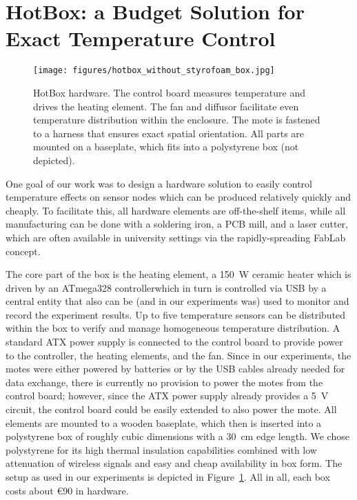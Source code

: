 \documentclass[color]{aib}
\begin{document}
\section{HotBox: a Budget Solution for Exact Temperature Control}

\begin{figure}[t]
\centering
\texttt{[image: figures/hotbox\_without\_styrofoam\_box.jpg]}
\caption{HotBox hardware. The control board measures temperature and drives the heating element. The fan and diffusor facilitate even temperature distribution within the enclosure. The mote is fastened to a harness that ensures exact spatial orientation. All parts are mounted on a baseplate, which fits into a polystyrene box (not depicted).}
\label{fig:hotbox}
\end{figure}

One goal of our work was to design a hardware solution to easily control temperature effects on sensor nodes which can be produced relatively quickly and cheaply.
To facilitate this, all hardware elements are off-the-shelf items, while all manufacturing can be done with a soldering iron, a PCB mill, and a laser cutter, which are often available in university settings via the rapidly-spreading FabLab concept.

The core part of the box is the heating element, a \SI{150}{W} ceramic heater which is driven by an ATmega328 controllerwhich in turn is controlled via USB by a central entity that also can be (and in our experiments was) used to monitor and record the experiment results.
Up to five temperature sensors can be distributed within the box to verify and manage homogeneous temperature distribution.
A standard ATX power supply is connected to the control board to provide power to the controller, the heating elements, and the fan.
Since in our experiments, the motes were either powered by batteries or by the USB cables already needed for data exchange, there is currently no provision to power the motes from the control board; however, since the ATX power supply already provides a \SI{5}{V} circuit, the control board could be easily extended to also power the mote.
All elements are mounted to a wooden baseplate, which then is inserted into a polystyrene box of roughly cubic dimensions with a \SI{30}{cm} edge length.
We chose polystyrene for its high thermal insulation capabilities combined with low attenuation of wireless signals\cite{ryan02master} and easy and cheap availability in box form.
The setup as used in our experiments is depicted in Figure~\ref{fig:hotbox}.
All in all, each box costs about \euro 90 in hardware.
\end{document}
